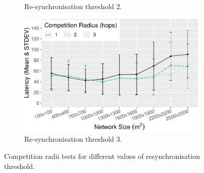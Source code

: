 \begin{figure}[H]
\begin{subfigure}{0.45\textwidth}
    \caption{Re-synchronisation threshold 2.}
    \label{subfig:resync-treshold-2-latency}
\end{subfigure}
\begin{subfigure}{0.45\textwidth}
    \centering
    \includegraphics[width=\textwidth, keepaspectratio]{figure/Results/ParameterEvaluation/ResyncThreshold3_Latency.pdf}
    \caption{Re-synchronisation threshold 3.}
    \label{subfig:resync-treshold-3-latency}
\end{subfigure}

    \caption{Competition radii tests for different values of resynchronisation threshold.}
    \label{fig:resync-treshold-tests-latency}
\end{figure}

